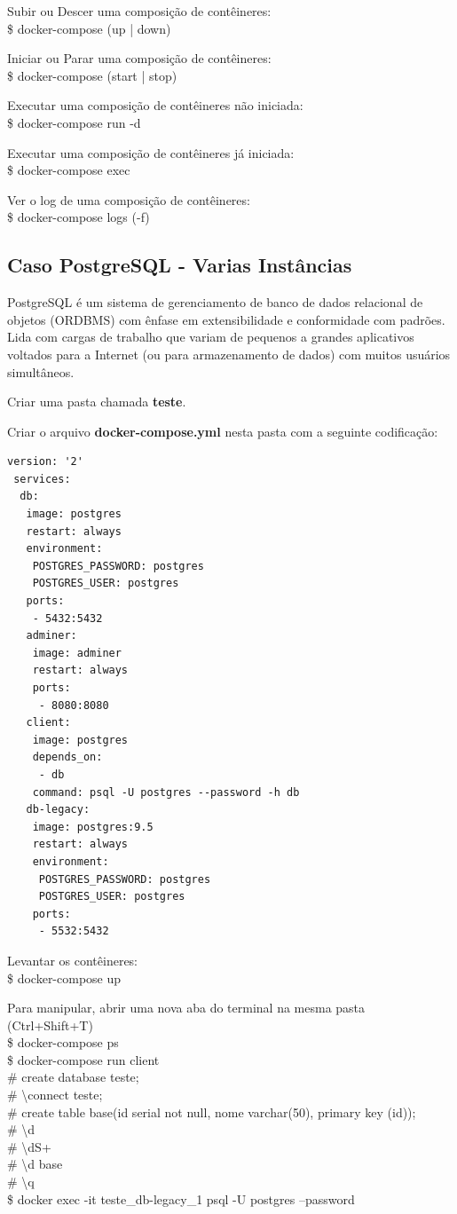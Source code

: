 \documentclass[a4paper,11pt]{article}
\begin{document}
Subir ou Descer uma composição de contêineres: \\
{\ttfamily\$ docker-compose (up | down)}

Iniciar ou Parar uma composição de contêineres: \\
{\ttfamily\$ docker-compose (start | stop)}

Executar uma composição de contêineres não iniciada: \\
{\ttfamily\$ docker-compose run -d}

Executar uma composição de contêineres já iniciada: \\
{\ttfamily\$ docker-compose exec}

Ver o log de uma composição de contêineres: \\
{\ttfamily\$ docker-compose logs (-f)}

\subsection{Caso PostgreSQL - Varias Instâncias}
PostgreSQL é um sistema de gerenciamento de banco de dados relacional de objetos (ORDBMS) com ênfase em extensibilidade e conformidade com padrões. Lida com cargas de trabalho que variam de pequenos a grandes aplicativos voltados para a Internet (ou para armazenamento de dados) com muitos usuários simultâneos. 

Criar uma pasta chamada \textbf{teste}.

Criar o arquivo \textbf{docker-compose.yml} nesta pasta com a seguinte codificação:
\begin{lstlisting}
version: '2'
 services:
  db:
   image: postgres
   restart: always
   environment:
    POSTGRES_PASSWORD: postgres
    POSTGRES_USER: postgres
   ports:
    - 5432:5432
   adminer:
    image: adminer
    restart: always
    ports:
     - 8080:8080
   client:
    image: postgres
    depends_on:
     - db
    command: psql -U postgres --password -h db
   db-legacy:
    image: postgres:9.5
    restart: always
    environment:
     POSTGRES_PASSWORD: postgres
     POSTGRES_USER: postgres
    ports:
     - 5532:5432
\end{lstlisting}
Levantar os contêineres: \\
{\ttfamily\$ docker-compose up}

Para manipular, abrir uma nova aba do terminal na mesma pasta (Ctrl+Shift+T) \\
{\ttfamily\$ docker-compose ps \\
\$ docker-compose run client \\
\# create database teste; \\
\# \textbackslash connect teste; \\
\# create table base(id serial not null, nome varchar(50), primary key (id)); \\
\# \textbackslash d \\
\# \textbackslash dS+ \\
\# \textbackslash d base \\
\# \textbackslash q \\
\$ docker exec -it teste\_db-legacy\_1 psql -U postgres --password}
\end{document}
